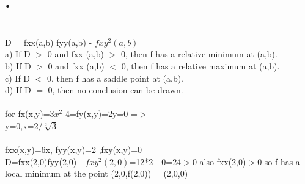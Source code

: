 \documentclass{article}
\begin{document}
\section{.}

\pgfplotsset{width=15cm,compat=1.16} 

\\
D = fxx(a,b) fyy(a,b) - $fxy^2(a,b)$\\
a) If D $>$ 0 and fxx (a,b) $>$ 0, then f has a relative minimum at (a,b).\\
b) If D $>$ 0 and fxx (a,b) $<$ 0, then f has a relative maximum at (a,b).\\
c) If D $<$ 0, then f has a saddle point at (a,b).\\
d) If D $=$ 0, then no conclusion can be drawn.\\
\\
for fx(x,y)=$3x^2$-4=fy(x,y)=2y=0 =$>$\\
y=0,x=2/$\sqrt[2]{3}$\\ \\
fxx(x,y)=6x, fyy(x,y)=2 ,fxy(x,y)=0\\
D=fxx(2,0)fyy(2,0) - $fxy^2(2,0)$=12*2 - 0=24$>$0 also fxx(2,0)$>$0 so f has a local minimum at the point (2,0,f(2,0)) = (2,0,0)
\end{document}
